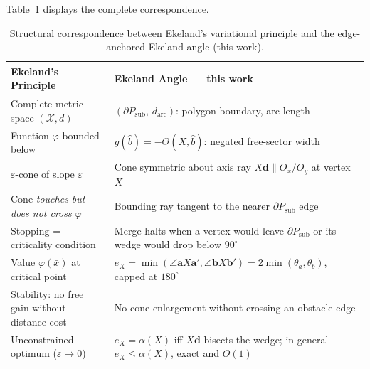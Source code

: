 \documentclass[10pt]{article}
\theoremstyle{plain}
\theoremstyle{definition}
\begin{document}
Table~\ref{tab:ekeland_correspondence} displays the complete correspondence.

\begin{table}[h]
\caption{Structural correspondence between Ekeland's variational principle
         and the edge-anchored Ekeland angle (this work).}
\label{tab:ekeland_correspondence}
\centering\small
\begin{tabular}{p{5.2cm}p{7.8cm}}
\toprule
\textbf{Ekeland's Principle} & \textbf{Ekeland Angle — this work} \\
\midrule
Complete metric space $(\mathcal{X},d)$
  & $(\partial P_{\mathrm{sub}},\,d_{\mathrm{arc}})$: polygon boundary,
    arc-length \\
Function $\varphi$ bounded below
  & $g(\hat{b}) = {-}\Theta(X,\hat{b})$: negated free-sector width \\
$\varepsilon$-cone of slope $\varepsilon$
  & Cone symmetric about axis ray $X\mathbf{d}\parallel O_x/O_y$ at vertex $X$ \\
Cone \emph{touches but does not cross} $\varphi$
  & Bounding ray tangent to the nearer $\partial P_{\mathrm{sub}}$ edge \\
Stopping = criticality condition
  & Merge halts when a vertex would leave $\partial P_{\mathrm{sub}}$ or its wedge would drop below $90^\circ$ \\
Value $\varphi(\bar{x})$ at critical point
  & $e_X = \min(\angle\mathbf{a}X\mathbf{a}',\angle\mathbf{b}X\mathbf{b}')=2\min(\theta_a,\theta_b)$, capped at $180^\circ$ \\
Stability: no free gain without distance cost
  & No cone enlargement without crossing an obstacle edge \\
Unconstrained optimum ($\varepsilon\to0$)
  & $e_X=\alpha(X)$ iff $X\mathbf{d}$ bisects the wedge; in general $e_X\le\alpha(X)$, exact and $O(1)$ \\
\bottomrule
\end{tabular}
\end{table}
\end{document}
